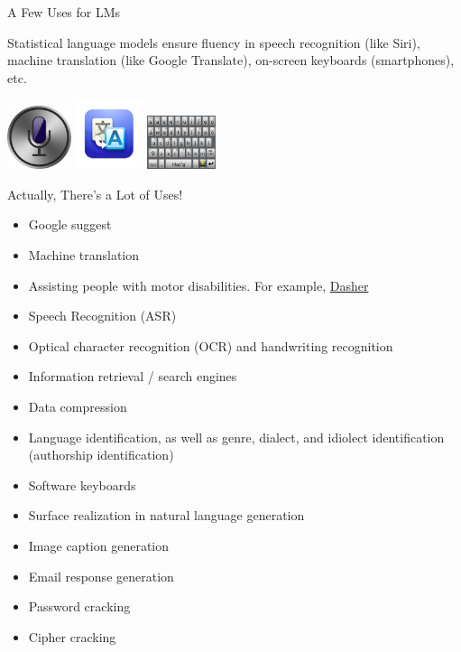 \documentclass[xcolor=pdftex,x11names,table,hyperref]{beamer}
\begin{document}
\begin{frame}{A Few Uses for LMs}
 \begin{block}{}
	 Statistical language models ensure fluency in speech recognition (like Siri), machine translation (like Google Translate), on-screen keyboards (smartphones), etc.
 \end{block}
\begin{center}
	\includegraphics[width=0.14\textwidth]{images/siri.jpg} \hspace{2em}
	\includegraphics[width=0.15\textwidth]{images/google-translate.jpg} \hspace{2em}
	\includegraphics[width=0.15\textwidth]{images/navajo-android-keyboard-crop.png}\\[.1ex]
\end{center}
\end{frame}

\begin{frame}{Actually, There's a Lot of Uses!}
\begin{small}
\begin{spacing}{0.85}
\begin{itemize}
 \item Google suggest
 \item Machine translation
 \item Assisting people with motor disabilities.  For example, \href{https://en.wikipedia.org/wiki/Dasher_(software)}{Dasher}
 \item Speech Recognition (ASR)
 \item Optical character recognition (OCR) and handwriting recognition
 \item Information retrieval / search engines
 \item Data compression
 \item Language identification, as well as genre, dialect, and idiolect identification (authorship identification)
 \item Software keyboards
 \item Surface realization in natural language generation
 \item Image caption generation
 \item Email response generation
 \item Password cracking
 \item Cipher cracking
\end{itemize}
\end{spacing}
\end{small}
\end{frame}
\end{document}
